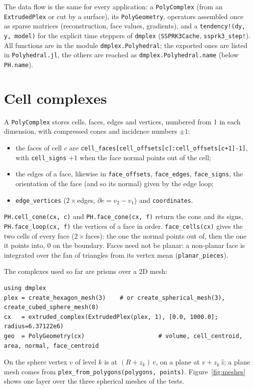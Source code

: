 \documentclass[11pt,a4paper]{article}
\newcommand{\code}[1]{\texttt{#1}}
\begin{document}
The data flow is the same for every application: a \code{PolyComplex} (from an \code{ExtrudedPlex}
or cut by a surface), its \code{PolyGeometry}, operators assembled once as sparse matrices
(reconstruction, face values, gradients), and a \code{tendency!(dy, y, model)} for the explicit
time steppers of \code{dmplex} (\code{SSPRK3Cache}, \code{ssprk3\_step!}). All functions are in the
module \code{dmplex.Polyhedral}; the exported ones are listed in \code{Polyhedral.jl}, the others are
reached as \code{dmplex.Polyhedral.name} (below \code{PH.name}).

\section{Cell complexes}\label{sec:complex}

A \code{PolyComplex} stores cells, faces, edges and vertices, numbered from 1 in each dimension,
with compressed cones and incidence numbers $\pm 1$:
\begin{itemize}
\item the faces of cell $c$ are \code{cell\_faces[cell\_offsets[c]:cell\_offsets[c+1]-1]}, with
  \code{cell\_signs} $+1$ when the face normal points out of the cell;
\item the edges of a face, likewise in \code{face\_offsets}, \code{face\_edges}, \code{face\_signs}, the
  orientation of the face (and so its normal) given by the edge loop;
\item \code{edge\_vertices} ($2\times$edges, $\partial e = v_2 - v_1$) and \code{coordinates}.
\end{itemize}
\code{PH.cell\_cone(cx, c)} and \code{PH.face\_cone(cx, f)} return the cone and its signs,
\code{PH.face\_loop(cx, f)} the vertices of a face in order. \code{face\_cells(cx)} gives the two cells
of every face ($2\times$faces): the one the normal points out of, then the one it points into, $0$ on
the boundary. Faces need not be planar: a non-planar face is integrated over the fan of triangles
from its vertex mean (\code{planar\_pieces}).

The complexes used so far are prisms over a 2D mesh:
\begin{lstlisting}
using dmplex
plex = create_hexagon_mesh(3)    # or create_spherical_mesh(3), create_cubed_sphere_mesh(8)
cx   = extruded_complex(ExtrudedPlex(plex, 1), [0.0, 1000.0]; radius=6.37122e6)
geo  = PolyGeometry(cx)                     # volume, cell_centroid, area, normal, face_centroid
\end{lstlisting}
On the sphere vertex $v$ of level $k$ is at $(R + z_k)\,v$, on a plane at $v + z_k\,\hat z$; a plane
mesh comes from \code{plex\_from\_polygons(polygons, points)}. Figure~\ref{fig:meshes} shows one layer
over the three spherical meshes of the tests.
\end{document}
